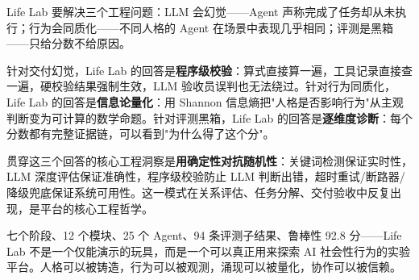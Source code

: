 \documentclass[12pt,a4paper]{article}%
\begin{document}
Life Lab 要解决三个工程问题：LLM 会幻觉——Agent 声称完成了任务却从未执行；行为会同质化——不同人格的 Agent 在场景中表现几乎相同；评测是黑箱——只给分数不给原因。

针对交付幻觉，Life Lab 的回答是\textbf{程序级校验}：算式直接算一遍，工具记录直接查一遍，硬校验结果强制生效，LLM 验收员误判也无法绕过。针对行为同质化，Life Lab 的回答是\textbf{信息论量化}：用 Shannon 信息熵把"人格是否影响行为"从主观判断变为可计算的数学命题。针对评测黑箱，Life Lab 的回答是\textbf{逐维度诊断}：每个分数都有完整证据链，可以看到"为什么得了这个分"。

贯穿这三个回答的核心工程洞察是\textbf{用确定性对抗随机性}：关键词检测保证实时性，LLM 深度评估保证准确性，程序级校验防止 LLM 判断出错，超时重试/断路器/降级兜底保证系统可用性。这一模式在关系评估、任务分解、交付验收中反复出现，是平台的核心工程哲学。

七个阶段、12 个模块、25 个 Agent、94 条评测子结果、鲁棒性 92.8 分——Life Lab 不是一个仅能演示的玩具，而是一个可以真正用来探索 AI 社会性行为的实验平台。人格可以被铸造，行为可以被观测，涌现可以被量化，协作可以被信赖。
\end{document}
